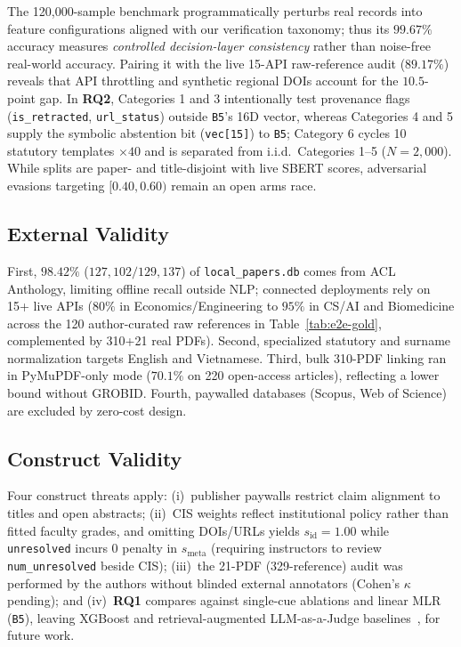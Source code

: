 The 120,000-sample benchmark programmatically perturbs real records into feature configurations aligned with our verification taxonomy; thus its $99.67\%$ accuracy measures \emph{controlled decision-layer consistency} rather than noise-free real-world accuracy. Pairing it with the live 15-API raw-reference audit ($89.17\%$) reveals that API throttling and synthetic regional DOIs account for the $10.5$-point gap. In \textbf{RQ2}, Categories 1 and 3 intentionally test provenance flags (\texttt{is\_retracted}, \texttt{url\_status}) outside \texttt{B5}'s 16D vector, whereas Categories 4 and 5 supply the symbolic abstention bit (\texttt{vec[15]}) to \texttt{B5}; Category 6 cycles 10 statutory templates $\times 40$ and is separated from i.i.d.\ Categories 1--5 ($N=2{,}000$). While splits are paper- and title-disjoint with live SBERT scores, adversarial evasions targeting $[0.40, 0.60)$ remain an open arms race.

\subsection{External Validity}

First, $98.42\%$ ($127{,}102/129{,}137$) of \texttt{local\_papers.db} comes from ACL Anthology, limiting offline recall outside NLP; connected deployments rely on 15+ live APIs ($80\%$ in Economics/Engineering to $95\%$ in CS/AI and Biomedicine across the 120 author-curated raw references in Table~\ref{tab:e2e-gold}, complemented by 310+21 real PDFs). Second, specialized statutory and surname normalization targets English and Vietnamese. Third, bulk 310-PDF linking ran in PyMuPDF-only mode ($70.1\%$ on 220 open-access articles), reflecting a lower bound without GROBID. Fourth, paywalled databases (Scopus, Web of Science) are excluded by zero-cost design.

\subsection{Construct Validity}

Four construct threats apply: (i)~publisher paywalls restrict claim alignment to titles and open abstracts; (ii)~CIS weights reflect institutional policy rather than fitted faculty grades, and omitting DOIs/URLs yields $s_{\text{id}} = 1.00$ while \texttt{unresolved} incurs $0$ penalty in $s_{\text{meta}}$ (requiring instructors to review \texttt{num\_unresolved} beside CIS); (iii)~the 21-PDF (329-reference) audit was performed by the authors without blinded external annotators (Cohen's $\kappa$ pending); and (iv)~\textbf{RQ1} compares against single-cue ablations and linear MLR (\texttt{B5}), leaving XGBoost and retrieval-augmented LLM-as-a-Judge baselines~\cite{hu2024refchecker}, \cite{press2024citeme} for future work.

